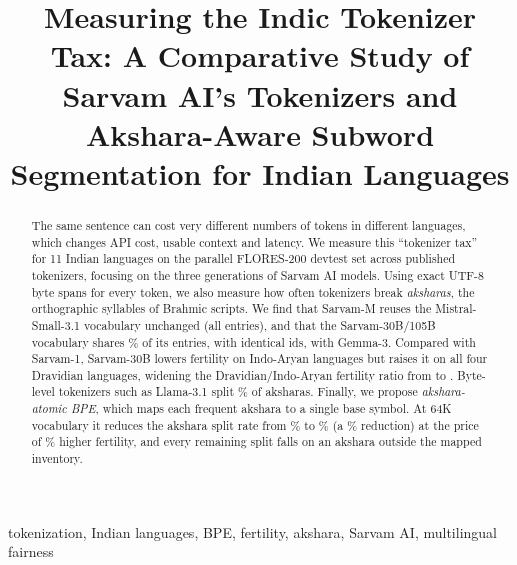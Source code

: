 \documentclass[conference]{IEEEtran}
\begin{document}
\title{Measuring the Indic Tokenizer Tax: A Comparative Study of Sarvam AI's Tokenizers and Akshara-Aware Subword Segmentation for Indian Languages}

\author{
}

\maketitle

\begin{abstract}
The same sentence can cost very different numbers of tokens in different languages, which changes API cost, usable context and latency. We measure this ``tokenizer tax'' for 11 Indian languages on the parallel FLORES-200 devtest set across  published tokenizers, focusing on the three generations of Sarvam AI models. Using exact UTF-8 byte spans for every token, we also measure how often tokenizers break \emph{aksharas}, the orthographic syllables of Brahmic scripts. We find that Sarvam-M reuses the Mistral-Small-3.1 vocabulary unchanged (all  entries), and that the Sarvam-30B/105B vocabulary shares \% of its entries, with identical ids, with Gemma-3. Compared with Sarvam-1, Sarvam-30B lowers fertility on  Indo-Aryan languages but raises it on all four Dravidian languages, widening the Dravidian/Indo-Aryan fertility ratio from  to . Byte-level tokenizers such as Llama-3.1 split \% of aksharas. Finally, we propose \emph{akshara-atomic BPE}, which maps each frequent akshara to a single base symbol. At 64K vocabulary it reduces the akshara split rate from \% to \% (a \% reduction) at the price of \% higher fertility, and every remaining split falls on an akshara outside the mapped inventory.
\end{abstract}

\begin{IEEEkeywords}
tokenization, Indian languages, BPE, fertility, akshara, Sarvam AI, multilingual fairness
\end{IEEEkeywords}
\end{document}
